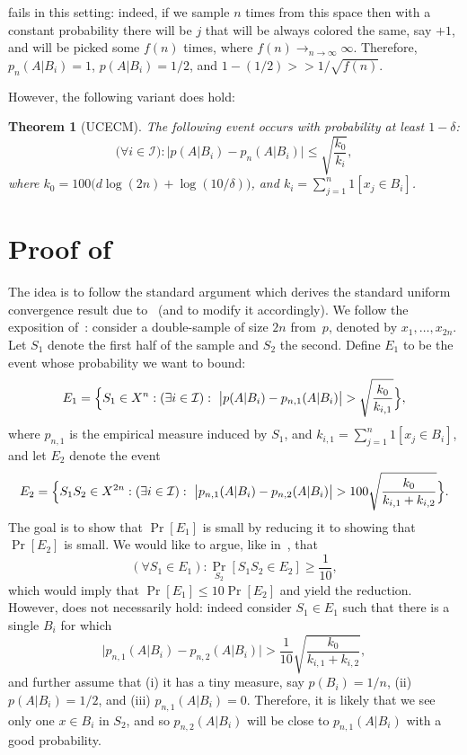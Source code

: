 \documentclass{article}
\newtheorem{theorem}{Theorem}[section]
\newcommand{\I}{\mathcal{I}}
\begin{document}
 fails in this setting:
indeed, if we sample $n$ times from this space 
then with a constant probability there will be  $j$
that will be always colored the same,  say $+1$, 
and will be picked some $f(n)$ times, where $f(n)\to_{n\to\infty}\infty$.
Therefore, $p_n(A\vert B_i) = 1$, $p(A\vert B_i)=1/2$,
and $1-(1/2)>> 1/\sqrt{f(n)}$.

However, the following variant does hold:
\begin{theorem}[UCECM]\label{thm:UCECM}
The following event occurs with probability at least $1-\delta$:
\[\bigl(\forall i\in\I\bigr):\bigl\lvert p(A \vert B_i) - p_n(A \vert B_i) \bigr\rvert \leq 
\sqrt{\frac{k_0}{k_i}},\]
where $k_0 =100\bigl(d\log(2n) + \log(10/\delta)\bigr)$, and $k_i = \sum_{j=1}^n 1[x_j\in B_i]$.
\end{theorem}

\section{Proof of }

The idea is to follow the standard argument which derives the standard uniform convergence
result due to~\cite{vapnik} (and to modify it accordingly). 
We follow the exposition of~\cite{anthony}:
consider a double-sample of size $2n$ from~$p$, denoted by $x_1,\ldots,x_{2n}$.
Let $S_1$ denote the first half of the sample and $S_2$ the second.
Define $E_1$ to be the event whose probability we want to bound:
\[E_1 = \Bigl\{ S_1\in X^n : (\exists i\in \I):~ 
\bigl\lvert p(A \vert B_i) - p_{n,1}(A \vert B_i) \bigr\rvert > 
\sqrt{\frac{k_0}{k_{i,1}}} \Bigr\},\]
where $p_{n,1}$ is the empirical measure induced by $S_1$, 
and $k_{i,1}=\sum_{j=1}^n 1[x_j\in B_i]$, 
and let $E_2$ denote the event
\[E_2 = 
\Bigl\{
S_1S_2\in X^{2n} : (\exists i\in\I):~
\bigl\lvert p_{n,1}(A \vert B_i)   -  p_{n,2}(A \vert B_i) \bigr\rvert >  
100\sqrt{\frac{k_0}{k_{i,1}+k_{i,2}}}
\Bigr\}.
\]
The goal is to show that $\Pr[E_1]$ is small by reducing it to showing that $\Pr[E_2]$ 
is small. We would like to argue, like in~\cite{anthony}, that
\begin{equation}\label{eq:anthony} 
(\forall S_1\in E_1): \Pr_{S_2}[S_1S_2\in E_2]\geq \frac{1}{10},
\end{equation}
which would imply that $\Pr[E_1]\leq 10\Pr[E_2]$ and yield the reduction.
However,  does not necessarily hold: indeed consider
$S_1\in E_1$ such that there is a single $B_i$ for which 
\[\bigl\lvert p_{n,1}(A \vert B_i)   -  p_{n,2}(A \vert B_i) \bigr\rvert >  
\frac{1}{10}\sqrt{\frac{k_0}{k_{i,1}+k_{i,2}}},\]
and further assume that 
(i) it has a tiny measure, say $p(B_i) = 1/n$,
(ii) $p(A\vert B_i)= 1/2$, and
(iii) $p_{n,1}(A\vert B_i) = 0$.
Therefore, it is likely that we see only one $x\in B_i$ in $S_2$,
and so $p_{n,2}(A \vert B_i)$ will be close to $p_{n,1}(A \vert B_i)$ with a good probability.
\end{document}
